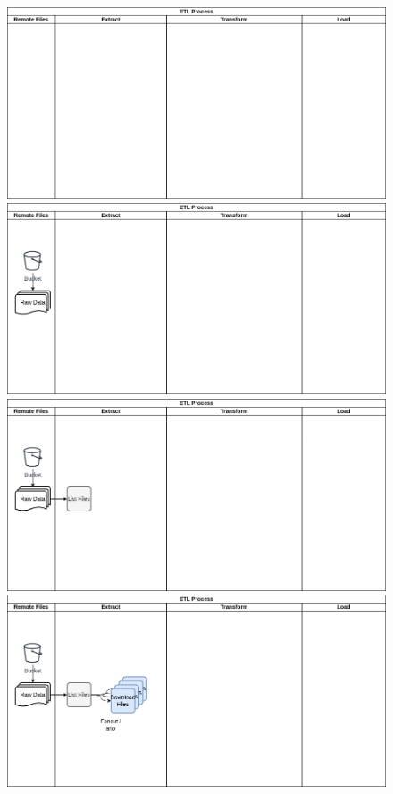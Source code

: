 \documentclass[10pt,brazil]{beamer}
\theoremstyle{definition}
\begin{document}
\begin{frame}[plain]
  \hspace*{-10mm}
  \begin{figure}
    \begin{center}
      \begin{overprint}
        \includegraphics[width=1\textwidth]{flow-1.png}
        \includegraphics[width=1\textwidth]{flow-2.png}
        \includegraphics[width=1\textwidth]{flow-3.png}
        \includegraphics[width=1\textwidth]{flow-4.png}

\end{overprint}
\end{center}
\end{figure}
\end{frame}
\end{document}

